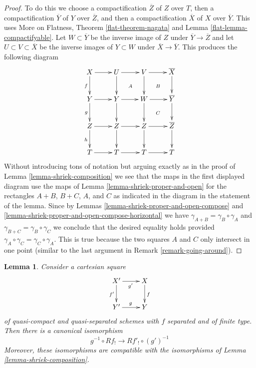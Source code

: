 \documentclass{stacks-project}
\theoremstyle{plain}
\newtheorem{lemma}[subsection]{Lemma}
\theoremstyle{definition}
\theoremstyle{remark}
\numberwithin{equation}{subsection}
\begin{document}
\begin{proof}
To do this we choose a compactification $\overline{Z}$
of $Z$ over $T$, then a compactification $\overline{Y}$ of $Y$ over
$\overline{Z}$, and then a compactification $\overline{X}$ of
$X$ over $\overline{Y}$. This uses
More on Flatness, Theorem \ref{flat-theorem-nagata} and
Lemma \ref{flat-lemma-compactifyable}.
Let $W \subset \overline{Y}$ be the inverse image of $Z$ under
$\overline{Y} \to \overline{Z}$ and let $U \subset V \subset \overline{X}$
be the inverse images of $Y \subset W$ under $\overline{X} \to \overline{Y}$.
This produces the following diagram
$$
\xymatrix{
X \ar[d]_f \ar[r] & U \ar[r] \ar[d] \ar@{}[dr]|A &
V \ar[d] \ar[r] \ar@{}[rd]|B & \overline{X} \ar[d] \\
Y \ar[d]_g \ar[r] & Y \ar[r] \ar[d] & W \ar[r] \ar[d] \ar@{}[rd]|C &
\overline{Y} \ar[d] \\
Z \ar[d]_h \ar[r] & Z \ar[d] \ar[r] & Z \ar[d] \ar[r] & \overline{Z} \ar[d] \\
T \ar[r] & T \ar[r] & T \ar[r] & T
}
$$
Without introducing tons of notation but arguing exactly
as in the proof of Lemma \ref{lemma-shriek-composition}
we see that the maps in the first displayed diagram use the
maps of Lemma \ref{lemma-shriek-proper-and-open} for the rectangles
$A + B$, $B + C$, $A$, and $C$ as indicated in the diagram in
the statement of the lemma. Since by
Lemmas \ref{lemma-shriek-proper-and-open-compose} and
\ref{lemma-shriek-proper-and-open-compose-horizontal}
we have $\gamma_{A + B} = \gamma_B \circ \gamma_A$ and
$\gamma_{B + C} = \gamma_B \circ \gamma_C$ we conclude
that the desired equality holds provided
$\gamma_A \circ \gamma_C = \gamma_C \circ \gamma_A$.
This is true because the two squares $A$ and $C$ only
intersect in one point (similar to the last argument in
Remark \ref{remark-going-around}).
\end{proof}

\begin{lemma}
\label{lemma-base-change-shriek}
Consider a cartesian square
$$
\xymatrix{
X' \ar[r]_{g'} \ar[d]_{f'} & X \ar[d]^f \\
Y' \ar[r]^g & Y
}
$$
of quasi-compact and quasi-separated schemes with $f$ separated and
of finite type. Then there is a canonical isomorphism
$$
g^{-1} \circ Rf_! \to Rf'_! \circ (g')^{-1}
$$
Moreover, these isomorphisms are compatible with the isomorphisms
of Lemma \ref{lemma-shriek-composition}.
\end{lemma}
\end{document}
